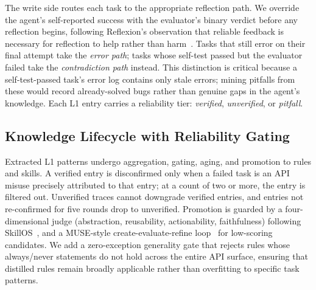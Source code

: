The write side routes each task to the appropriate reflection path. We override the agent's self-reported success with the evaluator's binary verdict before any reflection begins, following Reflexion's observation that reliable feedback is necessary for reflection to help rather than harm~\cite{shinn2023reflexion}. Tasks that still error on their final attempt take the \emph{error path}; tasks whose self-test passed but the evaluator failed take the \emph{contradiction path} instead. This distinction is critical because a self-test-passed task's error log contains only stale errors; mining pitfalls from these would record already-solved bugs rather than genuine gaps in the agent's knowledge. Each L1 entry carries a reliability tier: \emph{verified}, \emph{unverified}, or \emph{pitfall}.

\subsection{Knowledge Lifecycle with Reliability Gating}
\label{sec:se_govern}

Extracted L1 patterns undergo aggregation, gating, aging, and promotion to rules and skills. A verified entry is disconfirmed only when a failed task is an API misuse precisely attributed to that entry; at a count of two or more, the entry is filtered out. Unverified traces cannot downgrade verified entries, and entries not re-confirmed for five rounds drop to unverified. Promotion is guarded by a four-dimensional judge (abstraction, reusability, actionability, faithfulness) following SkillOS~\cite{ouyang2026skillos}, and a MUSE-style create-evaluate-refine loop~\cite{lin2026muse} for low-scoring candidates. We add a zero-exception generality gate that rejects rules whose always/never statements do not hold across the entire API surface, ensuring that distilled rules remain broadly applicable rather than overfitting to specific task patterns.


